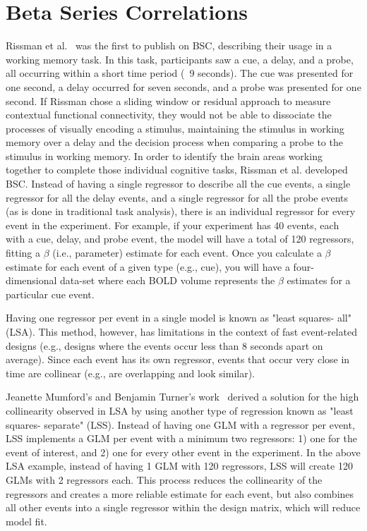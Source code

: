 \documentclass[phd,appendix,figures]{uithesis}
\begin{document}
\section{Beta Series Correlations}

Rissman et al.~\cite{Rissman2004} was the first to publish on BSC,
describing their usage in a working memory task.
In this task, participants saw a cue, a delay, and a probe, all occurring
within a short time period (~9 seconds).
The cue was presented for one second, a delay occurred for seven seconds,
and a probe was presented for one second.
If Rissman chose a sliding window or residual approach to measure contextual functional connectivity,
they would not be able to dissociate the processes of visually encoding a stimulus,
maintaining the stimulus in working memory over a delay and the decision process when comparing a
probe to the stimulus in working memory.
In order to identify the brain areas working together to complete those individual cognitive tasks,
Rissman et al. developed BSC.
Instead of having a single regressor to describe all the cue events,
a single regressor for all the delay events, and a single regressor for all the
probe events (as is done in traditional task analysis),
there is an individual regressor for every event in the experiment.
For example, if your experiment has 40 events, each with a cue, delay, and
probe event, the model will have a total of 120 regressors, fitting a $\beta$
(i.e., parameter) estimate for each event.
Once you calculate a $\beta$ estimate for each event of a given type
(e.g., cue), you will have a four-dimensional data-set where each BOLD volume
represents the $\beta$ estimates for a particular cue event.

Having one regressor per event in a single model is known as "least squares- all" (LSA).
This method, however, has limitations in the context of fast event-related
designs (e.g., designs where the events occur less than 8
seconds apart on average).
Since each event has its own regressor, events that occur very close in time
are collinear (e.g., are overlapping and look similar).

Jeanette Mumford's and Benjamin Turner's work~\cite{Turner2010,Mumford2012} derived a solution for
the high collinearity observed in LSA by using another
type of regression known as "least squares- separate" (LSS).
Instead of having one GLM with a regressor per event,
LSS implements a GLM per event with a minimum two regressors:
1) one for the event of interest, and 2) one for every other event in the
experiment.
In the above LSA example, instead of having 1 GLM with 120 regressors,
LSS will create 120 GLMs with 2 regressors each.
This process reduces the collinearity of the regressors and creates a more reliable
estimate for each event, but also combines all other events into a single regressor
within the design matrix, which will reduce model fit.
\end{document}
